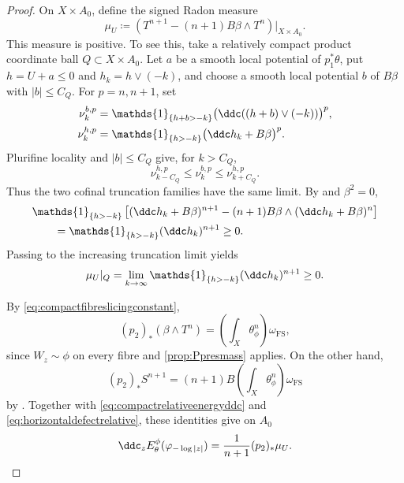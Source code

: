 \begin{proof}
    On $X\times A_0$, define the signed Radon measure
    \begin{equation}\label{eq:horizontaldefectrelative}
        \mu_U\coloneqq
        \left(T^{n+1}-(n+1)B\beta\wedge T^n\right)|_{X\times A_0}.
    \end{equation}
    This measure is positive. To see this, take a relatively compact product coordinate ball $Q\subset X\times A_0$. Let $a$ be a smooth local potential of $p_1^*\theta$, put $h=U+a\leq0$ and $h_k=h\lor(-k)$, and choose a smooth local potential $b$ of $B\beta$ with $|b|\leq C_Q$. For $p=n,n+1$, set
    \[
        \begin{aligned}
        \nu_k^{b,p}&=\mathds{1}_{\{h+b>-k\}}
        \bigl(\ddc((h+b)\lor(-k))\bigr)^p,\\
        \nu_k^{h,p}&=\mathds{1}_{\{h>-k\}}
        \bigl(\ddc h_k+B\beta\bigr)^p.
        \end{aligned}
    \]
    Plurifine locality and $|b|\leq C_Q$ give, for $k>C_Q$,
    \[
        \nu_{k-C_Q}^{h,p}\leq\nu_k^{b,p}\leq\nu_{k+C_Q}^{h,p}.
    \]
    Thus the two cofinal truncation families have the same limit. By  and $\beta^2=0$,
    \begin{equation}\label{eq:horizontalfinitelevelrelative}
        \begin{aligned}
        &\mathds{1}_{\{h>-k\}}\left[
        (\ddc h_k+B\beta)^{n+1}
        -(n+1)B\beta\wedge(\ddc h_k+B\beta)^n\right]\\
        &\qquad=\mathds{1}_{\{h>-k\}}(\ddc h_k)^{n+1}\geq0.
        \end{aligned}
    \end{equation}
    Passing to the increasing truncation limit yields
    \begin{equation}\label{eq:horizontaltruncationrelative}
        \mu_U|_Q=\lim_{k\to\infty}
        \mathds{1}_{\{h>-k\}}(\ddc h_k)^{n+1}\geq0.
    \end{equation}

    By \eqref{eq:compactfibreslicingconstant},
    \[
        (p_2)_*(\beta\wedge T^n)
        =\left(\int_X\theta_\phi^n\right)\omega_{\mathrm{FS}},
    \]
    since $W_z\sim\phi$ on every fibre and \cref{prop:Ppresmass} applies. On the other hand,
    \[
        (p_2)_*S^{n+1}
        =(n+1)B\left(\int_X\theta_\phi^n\right)\omega_{\mathrm{FS}}
    \]
    by . Together with \eqref{eq:compactrelativeenergyddc} and \eqref{eq:horizontaldefectrelative}, these identities give on $A_0$
    \begin{equation}\label{eq:relativeenergycurvature}
        \ddc_z E_\theta^\phi(\varphi_{-\log|z|})
        =\frac{1}{n+1}(p_2)_*\mu_U.
    \end{equation}


\end{proof}
